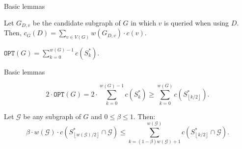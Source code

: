\documentclass{beamer}
\newcommand{\br}[1]{\mathopen{}\left( #1 \right)}
\newcommand{\fl}[1]{\mathopen{}\left\lfloor #1 \right\rfloor}
\newcommand{\OPT}{\texttt{OPT}}
\begin{document}
\begin{frame}{Basic lemmas}
\begin{lemma}\label{contributionLemma}
Let $G_{D,v}$ be the candidate subgraph of $G$ in which 
$v$ is queried when using $D$. Then,
$
c_G\br{D} = \sum_{v \in V\br{G}} w\br{G_{D,v}} \cdot c\br{v}.
$
\end{lemma}
    \pause
\begin{lemma}
    $\OPT\br{G}=\sum_{k=0}^{w\br{G}-1}c\br{S_{k}^*}.$
\end{lemma}
\end{frame}

    


\begin{frame}{Basic lemmas}
\begin{lemma}\label{lb_opt}
    $$
    2\cdot\OPT\br{G}= 2\cdot\sum_{k=0}^{w\br{G}-1}c\br{S_{k}^*} \geq \sum_{k=0}^{w\br{G}}c\br{S_{\fl{k/2}}^*}.
    $$
\end{lemma}
    \pause
\begin{lemma}\label{splitting}
    Let $\mathcal{G}$ be any subgraph of $G$ and $0\leq\beta\leq 1$. Then: 
            $$
           \beta\cdot w\br{\mathcal{G}}\cdot c\br{S_{\fl{w\br{\mathcal{G}}/2}}^*\cap \mathcal{G}}
            \leq \sum_{k=\br{1-\beta}w\br{\mathcal{G}}+1}^{w\br{\mathcal{G}}}c\br{S_{\fl{k/2}}^*\cap \mathcal{G}}.
            $$
\end{lemma}
\end{frame}
\end{document}
